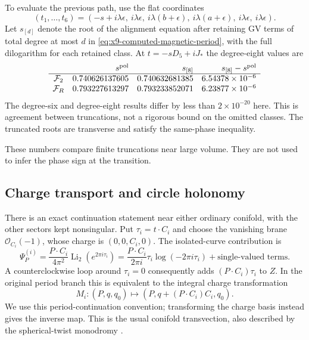 To evaluate the previous path, use the flat coordinates
\begin{equation}
 (t_1,\ldots,t_6)=
 (-s+i\lambda\epsilon,\ i\lambda\epsilon,\ i\lambda(b+\epsilon),\
 i\lambda(a+\epsilon),\ i\lambda\epsilon,\ i\lambda\epsilon).
 \label{eq:x9-mirror-flat-path}
\end{equation}
Let $s_{[d]}$ denote the root of the alignment equation after
retaining GV terms of total degree at most $d$ in
\eqref{eq:x9-computed-magnetic-period}, with the full dilogarithm
for each retained class. At $t=-sD_5+iJ_*$ the degree-eight values are
\begin{equation}
 \begin{array}{c@{\quad}r@{\quad}r@{\quad}r}
  &s^{\rm pol}&s_{[8]}&s_{[8]}-s^{\rm pol}\\ \hline
 \mathcal F_2&0.740626137605&0.740632681385&6.54378\times10^{-6}\\
 \mathcal F_R&0.793227613297&0.793233852071&6.23877\times10^{-6}
 \end{array}
 \label{eq:x9-quantum-wall-numbers}
\end{equation}
The degree-six and degree-eight results differ by less than
$2\times10^{-20}$ here. This is agreement between truncations,
not a rigorous bound on the omitted classes. The truncated roots
are transverse and satisfy the same-phase inequality.

These numbers compare finite truncations near large volume.
They are not used to infer the phase sign at the transition.

\subsection{Charge transport and circle holonomy}
There is an exact continuation statement near either ordinary
conifold, with the other sectors kept nonsingular. Put
$\tau_i=t\cdot C_i$ and choose the vanishing brane
$\mathcal O_{C_i}(-1)$, whose charge is $(0,0,C_i,0)$.
The isolated-curve contribution is
\begin{equation}
 \Psi_P^{(i)}=\frac{P\cdot C_i}{4\pi^2}
        \operatorname{Li}_2(e^{2\pi i\tau_i})
 =\frac{P\cdot C_i}{2\pi i}\tau_i\log(-2\pi i\tau_i)
       +\text{single-valued terms}.
 \label{eq:x9-nodal-period-monodromy}
\end{equation}
A counterclockwise loop around $\tau_i=0$ consequently adds
$(P\cdot C_i)\tau_i$ to $Z$. In the original period branch this
is equivalent to the integral charge transformation
\begin{equation}
 M_i:(P,q,q_0)\longmapsto
       (P,q+(P\cdot C_i)C_i,q_0).
 \label{eq:x9-nodal-charge-monodromy}
\end{equation}
We use this period-continuation convention; transforming the charge
basis instead gives the inverse map. This is the usual conifold
transvection, also described by the spherical-twist monodromy
\cite[Section~5]{Aspinwall:2017Discriminants}.

